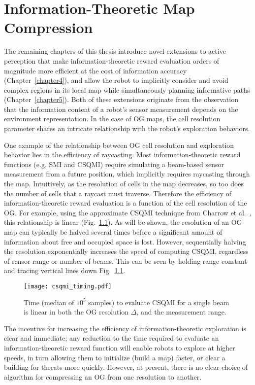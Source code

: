 \chapter{Information-Theoretic Map Compression}
\label{chapter3}

The remaining chapters of this thesis introduce novel extensions to active perception
that make information-theoretic reward evaluation orders of magnitude more
efficient at the cost of information accuracy (Chapter~\ref{chapter4}), and allow the
robot to implicitly consider and avoid complex regions
in its local map while simultaneously planning informative paths (Chapter~\ref{chapter5}). Both
of these extensions originate from the observation that the information content
of a robot's sensor measurement depends on the environment
representation. In the case of OG maps, the cell resolution parameter shares an
intricate relationship with the robot's exploration behaviors.

One example of the relationship between OG cell resolution and exploration
behavior lies in the efficiency of raycasting. Most information-theoretic reward
functions (e.g. SMI and CSQMI) require simulating a beam-based sensor measurement from a future
position, which implicitly requires raycasting through the map. Intuitively, as
the resolution of cells in the map decreases, so too does the number of cells
that a raycast must traverse. Therefore the efficiency of information-theoretic reward evaluation
is a function of the cell resolution of the OG. For example, using the approximate
CSQMI technique from Charrow et al.~\cite{charrow2015icra}, this relationship is linear
(Fig.~\ref{fig:csqmi_timing}). As will be shown, the resolution of an OG map can typically be halved several
times before a significant amount of information about free and occupied space
is lost. However, sequentially halving the resolution exponentially increases the
speed of computing CSQMI, regardless of sensor range or number of beams. This
can be seen by holding range constant and tracing vertical lines down Fig.~\ref{fig:csqmi_timing}.

\begin{figure}
  \centering
  \texttt{[image: csqmi\_timing.pdf]}
  \caption{Time (median of $10^5$ samples) to evaluate CSQMI for a
    single beam is linear in both the OG resolution $\Delta$, and
  the measurement range. \label{fig:csqmi_timing}}
\end{figure}

The incentive for increasing the efficiency of information-theoretic exploration
is clear and immediate; any reduction to the time required to evaluate an
information-theoretic reward function will enable robots to explore at higher
speeds, in turn allowing them to initialize (build a map) faster, or clear a
building for threats more quickly. However, at present, there is no clear choice
of algorithm for compressing an OG from one resolution to another.


